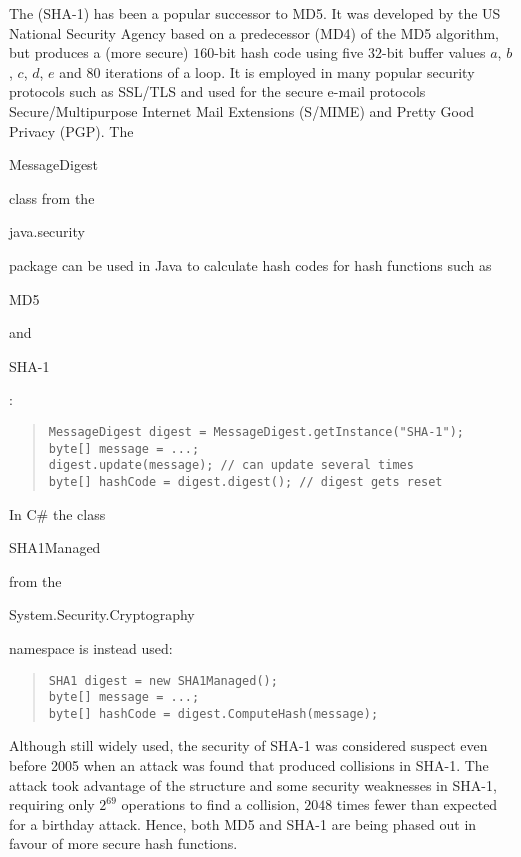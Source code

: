 The  (SHA-1) has been a popular
successor to MD5. It was developed by the US National Security
Agency based on a predecessor (MD4) of the MD5 algorithm, but
produces a (more secure) $160$-bit hash code using five $32$-bit
buffer values $a$, $b$, $c$, $d$, $e$ and $80$ iterations of a
loop. It is employed in many popular security protocols such as
SSL/TLS and used for the secure e-mail protocols
Secure/Multipurpose Internet Mail Extensions (S/MIME) and Pretty
Good Privacy (PGP). The \begin{code}MessageDigest\end{code} class
from the \begin{code}java.security\end{code} package can be used
in Java to calculate hash codes for hash functions such as
\begin{code}MD5\end{code} and \begin{code}SHA-1\end{code}:
\begin{quote}\begin{code}\begin{verbatim}
MessageDigest digest = MessageDigest.getInstance("SHA-1");
byte[] message = ...;
digest.update(message); // can update several times
byte[] hashCode = digest.digest(); // digest gets reset
\end{verbatim}\end{code}\end{quote}
In C\# the class \begin{code}SHA1Managed\end{code} from the
\begin{code}System.Security.Cryptography\end{code} namespace is instead used:
\begin{quote}\begin{code}\begin{verbatim}
SHA1 digest = new SHA1Managed();
byte[] message = ...;
byte[] hashCode = digest.ComputeHash(message);
\end{verbatim}\end{code}\end{quote}

Although still widely used, the security of SHA-1 was considered suspect even before 2005
when an attack was found that produced collisions in SHA-1.
The attack took advantage of the structure and some security weaknesses in SHA-1,
requiring only $2^{69}$ operations to find a collision,
$2048$ times fewer than expected for a birthday attack.
Hence, both MD5 and SHA-1 are being phased out in favour of more secure hash functions.

